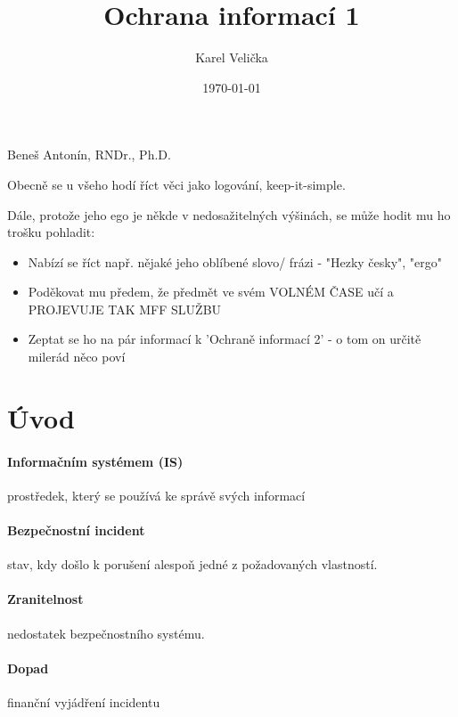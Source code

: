 \documentclass[10pt,a4paper]{article}
\title{Ochrana informací 1}
\date{\today}
\author{\sc Karel Velička}
\begin{document}
\maketitle

\begin{center}
    Beneš Antonín, RNDr., Ph.D.
\end{center}

\begin{em}
Obecně se u všeho hodí říct věci jako logování, keep-it-simple.

Dále, protože jeho ego je někde v nedosažitelných výšinách, se může hodit mu ho trošku pohladit:
\begin{itemize}
    \item Nabízí se říct např. nějaké jeho oblíbené slovo/ frázi - "Hezky česky", "ergo"
    \item Poděkovat mu předem, že předmět ve svém VOLNÉM ČASE učí a PROJEVUJE TAK MFF SLUŽBU
    \item Zeptat se ho na pár informací k 'Ochraně informací 2' - o tom on určitě milerád něco poví
\end{itemize}
\end{em}

\tableofcontents
\newpage


\section{Úvod}

\paragraph*{Informačním systémem (IS)} prostředek, který se používá ke správě svých informací

\paragraph*{Bezpečnostní incident} stav, kdy došlo k porušení alespoň jedné z požadovaných vlastností.

\paragraph*{Zranitelnost} nedostatek bezpečnostního systému.

\paragraph*{Dopad} finanční vyjádření incidentu
\end{document}
